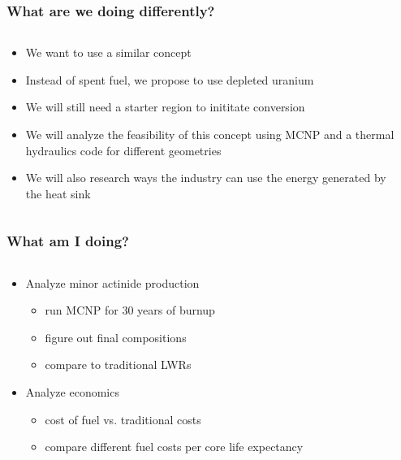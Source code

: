\begin{frame}
\frametitle{What are we doing differently?}
\begin{columns}[t]
\begin{column}{.6\textwidth}
\begin{itemize}
\item We want to use a similar concept
\item Instead of spent fuel, we propose to use depleted uranium
\item We will still need a starter region to inititate conversion
\item We will analyze the feasibility of this concept using MCNP and a thermal hydraulics code for different geometries
\item We will also research ways the industry can use the energy generated by the heat sink
\end{itemize}
\end{column}
\begin{column}{.4\textwidth}
\end{column}
\end{columns}
\end{frame}


\begin{frame}
\frametitle{What am I doing?}
\begin{columns}[t]
\begin{column}{.6\textwidth}
\begin{itemize}
\item Analyze minor actinide production
\begin{itemize}
\item run MCNP for 30 years of burnup
\item figure out final compositions
\item compare to traditional LWRs
\end{itemize}
\item Analyze economics
\begin{itemize}
\item cost of fuel vs. traditional costs
\item compare different fuel costs per core life expectancy
\end{itemize}
\end{itemize}
\end{column}
\begin{column}{.4\textwidth}
\end{column}
\end{columns}
\end{frame}


